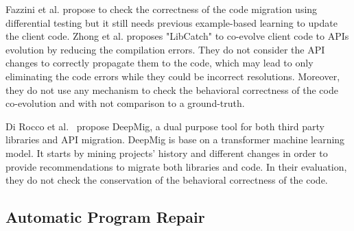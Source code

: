  Fazzini et al. \cite{10.1145/3387905.3388608} propose to check the correctness of the code migration using differential testing but it still needs previous example-based learning to update the client code.
 Zhong et al. \cite{10.1145/3597503.3639084} proposes "LibCatch" to co-evolve client code to APIs evolution by reducing the compilation errors. They do not consider the API changes to correctly propagate them to the code, which may lead to only eliminating the code errors while they could be incorrect resolutions. Moreover, they do not use any mechanism to check the behavioral correctness of the code co-evolution and with not comparison to a ground-truth.
 
Di Rocco et al.~\cite{DIROCCO2025107588} propose DeepMig, a dual purpose tool for both third party libraries and API migration. DeepMig is base on a transformer machine learning model. It starts by mining projects' history and different changes in order to provide recommendations to migrate both libraries and code. In their evaluation, they do not check the conservation of the behavioral correctness of the code.
 
 
 
 
 
 
 \subsection{Automatic Program Repair}
 \label{APR}
 
